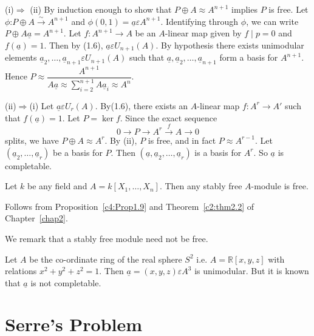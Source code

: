 \begin{Proof}
(i)$\Rightarrow$ (ii) By induction enough to show that $P\oplus
  A\approx A^{n+1}$ implies $P$ is free. Let $\phi$:$P\oplus
  A\xrightarrow{\sim} A^{n+1}$ and
  $\phi(0,1)=\underline{a}\varepsilon A^{n+1}$. Identifying through
  $\phi$, we can write $P \oplus A \underline{a}=A^{n+1}$. Let
  $f:A^{n+1}\rightarrow A $ be an $A$-linear map given by $f\mid p=0$
  and $f(\underline{a})=1$. Then by (1.6), $\underline{a}\varepsilon
  U_{n+1}(A)$. By hypothesis there exists unimodular elements
  $\underline{a}_2,\ldots,\underline{a}_{n+1} \varepsilon U_{n+1}(A)$
  such that $\underline{a},\underline{a}_2,\ldots,\underline{a}_{n+1}$
  form a basis for $A^{n+1}$. Hence $P\approx
  \dfrac{A^{n+1}}{A\underline{a}\approx
    \sum\limits_{i=2}^{n+1}A\underline{a}_i\approx A^{n}}$.

(ii)$\Rightarrow$(i) Let $\underline{a}\varepsilon U_r(A)$. By(1.6),
  there exists an $A$-linear map $f:A^{r}\rightarrow A'$ such that
  $f(\underline{a})=1$. Let $P=\ker f$. Since the exact sequence
$$
0\rightarrow P\rightarrow A^{r}\xrightarrow{f} A\rightarrow 0
$$
splits, we have $P\oplus A\approx A^{r}$. By (ii), $P$ is free, and in
fact $P\approx A^{r-1}$. Let
$(\underline{a}_2,\ldots,\underline{a}_r)$ be a basis for $P$. Then
$(\underline{a}, \underline{a}_2,\ldots,\underline{a}_r)$ is a basis
for $A^{r}$. So $\underline{a}$ is completable.
\enprf
\end{Proof}

\begin{thm}\label{c4:thm1.10}
Let $k$ be any field and $A=k[X_1,\ldots,X_n]$. Then any stably free
$A$-module is free.
\end{thm}

\begin{Proof}
Follows from Proposition~\ref{c4:Prop1.9} and Theorem~\ref{c2:thm2.2}
of Chapter~\ref{chap2}.

We remark that a stably free module need not be free.
\enprf
\end{Proof}

\begin{exple}\label{c4:exple1.11}
Let $A$ be the co-ordinate ring of the real sphere $S^{2}$
i.e. $A=\mathbb{R}[x,y,z]$ with relations $x^{2}+y^{2}+z^{2}=1$. Then
$\underline{a}=(x,y,z)\varepsilon A^{3}$ is unimodular. But it is
known that $\underline{a}$ is not completable.
\end{exple}

\section{Serre's Problem}\label{c4:s2}

